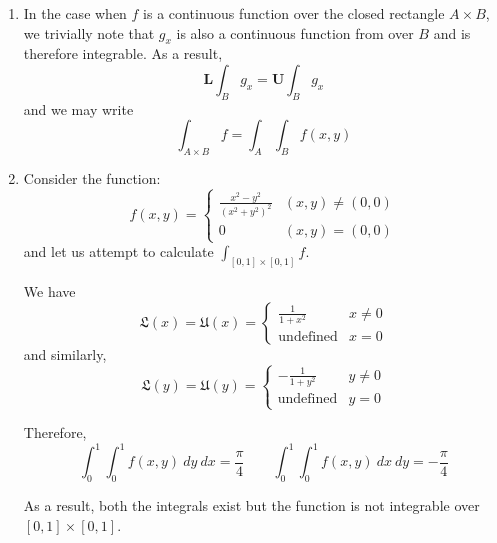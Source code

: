 \begin{enumerate}
    \item In the case when $f$ is a continuous function over the closed rectangle $A\times B$, we trivially note that $g_x$ is also a continuous function from over $B$ and is therefore integrable. As a result, 
    \begin{equation*}
        \mathbf{L}\int_Bg_x = \mathbf{U}\int_Bg_x
    \end{equation*} 
    and we may write 
    \begin{equation*}
        \int_{A\times B}f = \int_A\int_Bf(x,y)
    \end{equation*}

    \item Consider the function: 
    \begin{equation*}
        f(x,y) = 
        \begin{cases}
            \frac{x^2 - y^2}{(x^2 + y^2)^2} & (x,y)\ne(0,0)\\
            0 & (x,y) = (0,0)
        \end{cases}
    \end{equation*}
    and let us attempt to calculate $\int_{[0,1]\times[0,1]}f$.

    We have 
    \begin{equation*}
        \mathfrak{L}(x) = \mathfrak{U}(x) = 
        \begin{cases}
            \frac{1}{1 + x^2} & x\ne 0\\
            \text{undefined} & x = 0
        \end{cases}
    \end{equation*}
    and similarly, 
    \begin{equation*}
        \mathfrak{L}(y) = \mathfrak{U}(y) = 
        \begin{cases}
            -\frac{1}{1 + y^2} & y\ne0\\
            \text{undefined} & y = 0
        \end{cases}
    \end{equation*}

    Therefore, 
    \begin{equation*}
        \int_{0}^1\int_{0}^1f(x,y)~dy~dx = \frac{\pi}{4}
        \qquad
        \int_{0}^1\int_{0}^1f(x,y)~dx~dy = -\frac{\pi}{4}
    \end{equation*}

    As a result, both the integrals exist but the function is not integrable over $[0,1]\times[0,1]$.
\end{enumerate}

